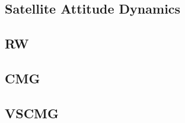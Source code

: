 \begin{comment}
\tikzset{every picture/.style={line width=0.75pt}} %
\begin{figure}[ht]
\centering

\caption{Single Gimble Control Moment Gyroscope basis vectors, initialy each SGCMG's wheel spin axis is facing towards x of pyramid, gimble axis is aligned with z axis}
\label{fig:sgcmg}
\end{figure}
\end{comment}
\subsection{Satellite Attitude Dynamics}
\subsection{RW}
\subsection{CMG}
\subsection{VSCMG}